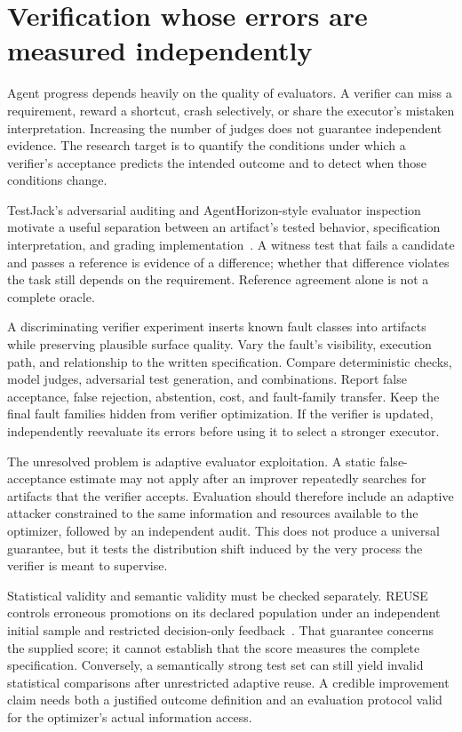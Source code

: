 \section{Verification whose errors are measured independently}\label{sec:C34:04}
Agent progress depends heavily on the quality of evaluators. A verifier can miss a requirement, reward a shortcut, crash selectively, or share the executor's mistaken interpretation. Increasing the number of judges does not guarantee independent evidence. The research target is to quantify the conditions under which a verifier's acceptance predicts the intended outcome and to detect when those conditions change.

TestJack's adversarial auditing and AgentHorizon-style evaluator inspection motivate a useful separation between an artifact's tested behavior, specification interpretation, and grading implementation~\cite{yao2026testjack,corpus261011050}. A witness test that fails a candidate and passes a reference is evidence of a difference; whether that difference violates the task still depends on the requirement. Reference agreement alone is not a complete oracle.

A discriminating verifier experiment inserts known fault classes into artifacts while preserving plausible surface quality. Vary the fault's visibility, execution path, and relationship to the written specification. Compare deterministic checks, model judges, adversarial test generation, and combinations. Report false acceptance, false rejection, abstention, cost, and fault-family transfer. Keep the final fault families hidden from verifier optimization. If the verifier is updated, independently reevaluate its errors before using it to select a stronger executor.

The unresolved problem is adaptive evaluator exploitation. A static false-acceptance estimate may not apply after an improver repeatedly searches for artifacts that the verifier accepts. Evaluation should therefore include an adaptive attacker constrained to the same information and resources available to the optimizer, followed by an independent audit. This does not produce a universal guarantee, but it tests the distribution shift induced by the very process the verifier is meant to supervise.

Statistical validity and semantic validity must be checked separately. REUSE controls erroneous promotions on its declared population under an independent initial sample and restricted decision-only feedback~\cite{ch02_reuse2026}. That guarantee concerns the supplied score; it cannot establish that the score measures the complete specification. Conversely, a semantically strong test set can still yield invalid statistical comparisons after unrestricted adaptive reuse. A credible improvement claim needs both a justified outcome definition and an evaluation protocol valid for the optimizer's actual information access.

